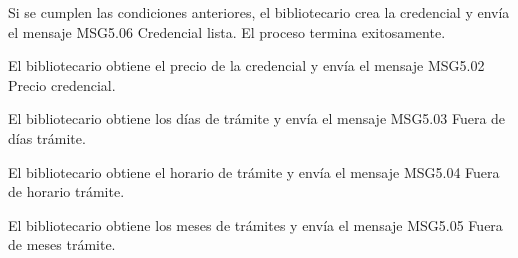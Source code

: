 \begin{PDescripcion}
\begin{enumerate}
      Si se cumplen las condiciones anteriores, el bibliotecario crea la credencial y envía el mensaje MSG5.06 Credencial lista. El proceso termina exitosamente.

      \Ppaso[\itarea]  El bibliotecario obtiene el precio de la credencial y envía el mensaje MSG5.02 Precio credencial.

      \Ppaso[\itarea]  El bibliotecario obtiene los días de trámite y envía el mensaje MSG5.03 Fuera de días trámite.

      \Ppaso[\itarea]  El bibliotecario obtiene el horario de trámite y envía el mensaje MSG5.04 Fuera de horario trámite.

      \Ppaso[\itarea]  El bibliotecario obtiene los meses de trámites y envía el mensaje MSG5.05 Fuera de meses trámite.
      
    \end{enumerate}

\end{PDescripcion}